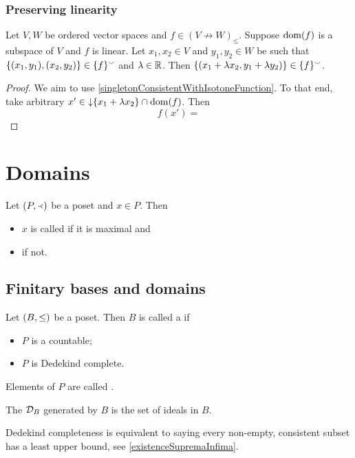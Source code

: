\subsubsection{Preserving linearity}

\begin{lemma}
Let $V,W$ be ordered vector spaces and $f\in (V\not\to W)_\leq$. Suppose $\operatorname{dom}(f)$ is a subspace of $V$ and $f$ is linear. Let $x_1,x_2\in V$ and $y_1,y_2\in W$ be such that $\{(x_1, y_1), (x_2, y_2)\} \in \{f\}^\smallsmile$ and $\lambda \in \mathbb{R}$. Then $\{(x_1 +\lambda x_2, y_1 + \lambda y_2)\} \in \{f\}^\smallsmile$.
\end{lemma}
\begin{proof}
We aim to use \ref{singletonConsistentWithIsotoneFunction}. To that end, take arbitrary $x'\in \operatorname{\downarrow}\{x_1 +\lambda x_2\} \cap \operatorname{dom}(f)$. Then
\[ f(x') =  \]
\end{proof}


\section{Domains}
\begin{definition}
Let $\sSet{P,\Yleft}$ be a poset and $x\in P$. Then
\begin{itemize}
\item $x$ is called  if it is maximal and
\item {} if not.
\end{itemize}
\end{definition}


\subsection{Finitary bases and domains}
\begin{definition}
Let $\sSet{B,\leq}$ be a poset. Then $B$ is called a  if
\begin{itemize}
\item $P$ is a countable;
\item $P$ is Dedekind complete.
\end{itemize}
Elements of $P$ are called .

The  $\mathcal{D}_B$ generated by $B$ is the set of ideals in $B$.
\end{definition}
Dedekind completeness is equivalent to saying every non-empty, consistent subset has a least upper bound, see \ref{existenceSupremaInfima}.

